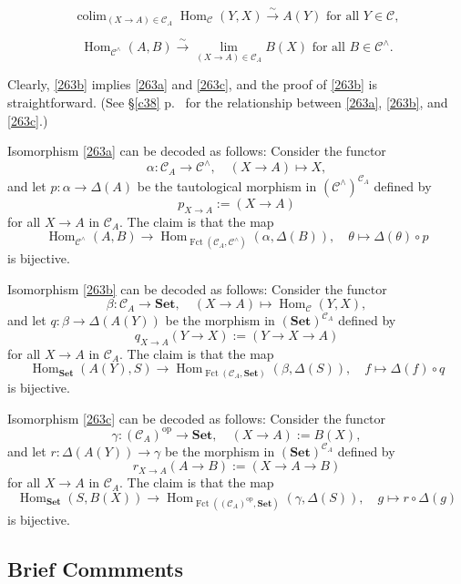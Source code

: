 \documentclass[12pt]{article}
\theoremstyle{remark}
\theoremstyle{definition}
\newcommand{\C}{\mathcal C}
\newcommand{\Set}{\mathbf{Set}}
\DeclareMathOperator*{\colim}{colim}
\DeclareMathOperator{\Fct}{Fct}
\DeclareMathOperator{\Hom}{Hom}
\DeclareMathOperator{\op}{op}
\begin{document}
\begin{equation}\label{263b}
\colim_{(X\to A)\in\C_A}\Hom_\C(Y,X)\xrightarrow\sim A(Y)\text{ for all }Y\in\C, 
\end{equation}

\begin{equation}\label{263c}
\Hom_{\C^\wedge}(A,B)\xrightarrow\sim\lim_{(X\to A)\in\C_A}B(X)\text{ for all }B\in\C^\wedge. 
\end{equation}

Clearly, \eqref{263b} implies \eqref{263a} and \eqref{263c}, and the proof of \eqref{263b} is straightforward. (See \S\ref{c38} p.~\pageref{c38} for the relationship between \eqref{263a}, \eqref{263b}, and \eqref{263c}.) 

Isomorphism \eqref{263a} can be decoded as follows: Consider the functor 
$$
\alpha:\C_A\to\C^\wedge,\quad(X\to A)\mapsto X,
$$ 
and let $p:\alpha\to\Delta(A)$ be the tautological morphism in $(\C^\wedge)^{\C_A}$ defined by 
%
\begin{equation}\label{pxa}
p_{X\to A}:=(X\to A)
\end{equation}
% 
for all $X\to A$ in $\C_A$. The claim is that the map 
$$
\Hom_{\C^\wedge}(A,B)\to\Hom_{\Fct(\C_A,\C^\wedge)}(\alpha,\Delta(B)),\quad\theta\mapsto\Delta(\theta)\circ p
$$ 
is bijective. 

Isomorphism \eqref{263b} can be decoded as follows: Consider the functor 
$$
\beta:\C_A\to\Set,\quad(X\to A)\mapsto\Hom_\C(Y,X), 
$$ 
and let $q:\beta\to\Delta(A(Y))$ be the morphism in $(\Set)^{\C_A}$ defined by 
$$
q_{X\to A}(Y\to X):=(Y\to X\to A)
$$ 
for all $X\to A$ in $\C_A$. The claim is that the map 
$$
\Hom_{\Set}(A(Y),S)\to\Hom_{\Fct(\C_A,\Set)}(\beta,\Delta(S)),\quad f\mapsto\Delta(f)\circ q
$$ 
is bijective. 

Isomorphism \eqref{263c} can be decoded as follows: Consider the functor 
$$
\gamma:(\C_A)^{\op}\to\Set,\quad(X\to A):=B(X),
$$ 
and let $r:\Delta(A(Y))\to\gamma$ be the morphism in $(\Set)^{\C_A}$ defined by 
$$
r_{X\to A}(A\to B):=(X\to A\to B)
$$ 
for all $X\to A$ in $\C_A$. The claim is that the map 
$$
\Hom_{\Set}(S,B(X))\to\Hom_{\Fct((\C_A)^{\op},\Set)}(\gamma,\Delta(S)),\quad g\mapsto r\circ\Delta(g)
$$ 
is bijective. 


\subsection{Brief Commments}
\end{document}
